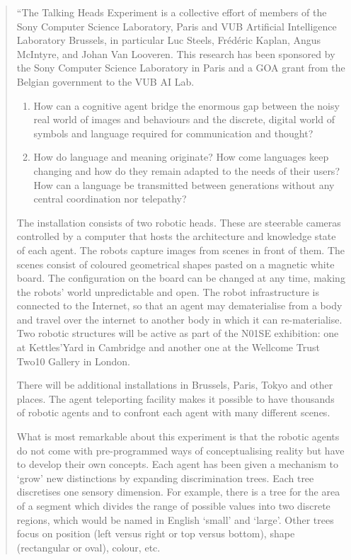 \begin{quotation}
``The Talking Heads Experiment is a collective effort of members of the Sony Computer Science Laboratory, Paris
and VUB Artificial Intelligence Laboratory Brussels, in particular Luc Steels, Fr\'{e}d\'{e}ric Kaplan, Angus McIntyre, 
and Johan Van Looveren. This research has been sponsored by the Sony Computer Science Laboratory in Paris and a 
GOA grant from the Belgian government to the VUB AI Lab.

\begin{enumerate}
\item How can a cognitive agent bridge the enormous gap between the noisy real world of images and behaviours and 
the discrete, digital world of symbols and language required for communication and thought? 
\item How do language and meaning originate? How come languages keep changing and how do they remain adapted to 
the needs of their users? How can a language be transmitted between generations without any central coordination 
nor telepathy?
\end{enumerate}

\vspace{1\baselineskip}

\noindent The installation consists of two robotic heads. These are steerable cameras controlled by a computer that hosts the 
architecture and knowledge state of each agent. The robots capture images from scenes in front of them. The scenes consist 
of coloured geometrical shapes pasted on a magnetic white board. The configuration on the board can be changed at any 
time, making the robots' world unpredictable and open. The robot infrastructure is connected to the Internet, so 
that an agent may dematerialise from a body and travel over the internet to another body in which it can re-materialise.
Two robotic structures will be active as part of the N01SE exhibition: one at Kettles'Yard in Cambridge and another 
one at the Wellcome Trust Two10 Gallery in London. 

There will be additional installations in Brussels, Paris, Tokyo and other places. The agent teleporting facility 
makes it possible to have thousands of robotic agents and to confront each agent with many different scenes. 

\vspace{1\baselineskip}

\noindent What is most remarkable about this experiment is that the robotic agents do not come with 
pre-programmed ways of conceptualising reality but have to develop their own concepts. Each agent has been 
given a mechanism to `grow' new distinctions by expanding discrimination trees. Each tree discretises one sensory 
dimension. For example, there is a tree for the area of a segment which divides the range of possible values
into two discrete regions, which would be named in English `small' and `large'. Other trees focus on position 
(left versus right or top versus bottom), shape (rectangular or oval), colour, etc. 


\end{quotation}
